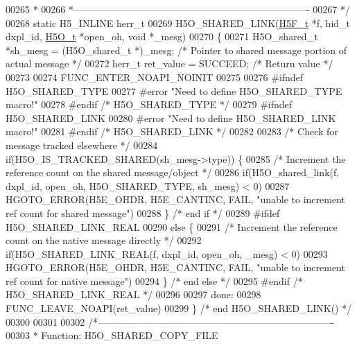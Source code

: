 \begin{DoxyCode}
00265 \textcolor{comment}{ *}
00266 \textcolor{comment}{ *-------------------------------------------------------------------------}
00267 \textcolor{comment}{ */}
00268 \textcolor{keyword}{static} H5\_INLINE herr\_t
00269 H5O\_SHARED\_LINK(\hyperlink{struct_h5_f__t}{H5F\_t} *f, hid\_t dxpl\_id, \hyperlink{struct_h5_o__t}{H5O\_t} *open\_oh, \textcolor{keywordtype}{void} *\_mesg)
00270 \{
00271     H5O\_shared\_t *sh\_mesg = (H5O\_shared\_t *)\_mesg;     \textcolor{comment}{/* Pointer to shared message portion of actual
       message */}
00272     herr\_t ret\_value = SUCCEED;         \textcolor{comment}{/* Return value */}
00273 
00274     FUNC\_ENTER\_NOAPI\_NOINIT
00275 
00276 \textcolor{preprocessor}{#ifndef H5O\_SHARED\_TYPE}
00277 \textcolor{preprocessor}{#error "Need to define H5O\_SHARED\_TYPE macro!"}
00278 \textcolor{preprocessor}{#endif }\textcolor{comment}{/* H5O\_SHARED\_TYPE */}\textcolor{preprocessor}{}
00279 \textcolor{preprocessor}{#ifndef H5O\_SHARED\_LINK}
00280 \textcolor{preprocessor}{#error "Need to define H5O\_SHARED\_LINK macro!"}
00281 \textcolor{preprocessor}{#endif }\textcolor{comment}{/* H5O\_SHARED\_LINK */}\textcolor{preprocessor}{}
00282 
00283     \textcolor{comment}{/* Check for message tracked elsewhere */}
00284     \textcolor{keywordflow}{if}(H5O\_IS\_TRACKED\_SHARED(sh\_mesg->type)) \{
00285         \textcolor{comment}{/* Increment the reference count on the shared message/object */}
00286         \textcolor{keywordflow}{if}(H5O\_shared\_link(f, dxpl\_id, open\_oh, H5O\_SHARED\_TYPE, sh\_mesg) < 0)
00287         HGOTO\_ERROR(H5E\_OHDR, H5E\_CANTINC, FAIL, \textcolor{stringliteral}{"unable to increment ref count for shared message"})
00288     \} \textcolor{comment}{/* end if */}
00289 \textcolor{preprocessor}{#ifdef H5O\_SHARED\_LINK\_REAL}
00290     \textcolor{keywordflow}{else} \{
00291         \textcolor{comment}{/* Increment the reference count on the native message directly */}
00292         \textcolor{keywordflow}{if}(H5O\_SHARED\_LINK\_REAL(f, dxpl\_id, open\_oh, \_mesg) < 0)
00293         HGOTO\_ERROR(H5E\_OHDR, H5E\_CANTINC, FAIL, \textcolor{stringliteral}{"unable to increment ref count for native message"})
00294     \} \textcolor{comment}{/* end else */}
00295 \textcolor{preprocessor}{#endif }\textcolor{comment}{/* H5O\_SHARED\_LINK\_REAL */}\textcolor{preprocessor}{}
00296 
00297 done:
00298     FUNC\_LEAVE\_NOAPI(ret\_value)
00299 \} \textcolor{comment}{/* end H5O\_SHARED\_LINK() */}
00300 
00301 
00302 \textcolor{comment}{/*-------------------------------------------------------------------------}
00303 \textcolor{comment}{ * Function:    H5O\_SHARED\_COPY\_FILE}

\end{DoxyCode}
